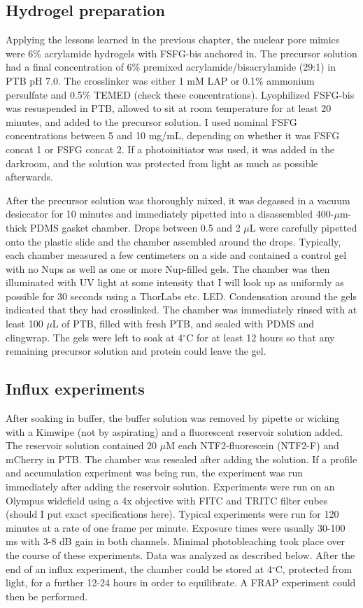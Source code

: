 \subsection{Hydrogel preparation}
Applying the lessons learned in the previous chapter, the nuclear pore mimics were 6\% acrylamide hydrogels with FSFG-bis anchored in.  The precursor solution had a final concentration of 6\% premixed acrylamide/bisacrylamide (29:1) in PTB pH 7.0.  The crosslinker was either 1 mM LAP or 0.1\% ammonium persulfate and 0.5\% TEMED (check these concentrations).  Lyophilized FSFG-bis was resuspended in PTB, allowed to sit at room temperature for at least 20 minutes, and added to the precursor solution.  I used nominal FSFG concentrations between 5 and 10 mg/mL, depending on whether it was FSFG concat 1 or FSFG concat 2.  If a photoinitiator was used, it was added in the darkroom, and the solution was protected from light as much as possible afterwards.

After the precursor solution was thoroughly mixed, it was degassed in a vacuum desiccator for 10 minutes and immediately pipetted into a disassembled 400-$\mu$m-thick PDMS gasket chamber. Drops between 0.5 and 2 $\mu$L were carefully pipetted onto the plastic slide and the chamber assembled around the drops.  Typically, each chamber measured a few centimeters on a side and contained a control gel with no Nups as well as one or more Nup-filled gels.  The chamber was then illuminated with UV light at some intensity that I will look up as uniformly as possible for 30 seconds using a ThorLabs etc. LED.  Condensation around the gels indicated that they had crosslinked.  The chamber was immediately rinsed with at least 100 $\mu$L of PTB, filled with fresh PTB, and sealed with PDMS and clingwrap.  The gels were left to soak at 4$^\circ$C for at least 12 hours so that any remaining precursor solution and protein could leave the gel.

\subsection{Influx experiments}
After soaking in buffer, the buffer solution was removed by pipette or wicking with a Kimwipe (not by aspirating) and a fluorescent reservoir solution added.  The reservoir solution contained 20 $\mu$M each NTF2-fluorescein (NTF2-F) and mCherry in PTB.  The chamber was resealed after adding the solution.  If a profile and accumulation experiment was being run, the experiment was run immediately after adding the reservoir solution.  Experiments were run on an Olympus widefield using a 4x objective with FITC and TRITC filter cubes (should I put exact specifications here).  Typical experiments were run for 120 minutes at a rate of one frame per minute.  Exposure times were usually 30-100 ms with 3-8 dB gain in both channels.  Minimal photobleaching took place over the course of these experiments.  Data was analyzed as described below.  After the end of an influx experiment, the chamber could be stored at 4$^\circ$C, protected from light, for a further 12-24 hours in order to equilibrate.  A FRAP experiment could then be performed.

